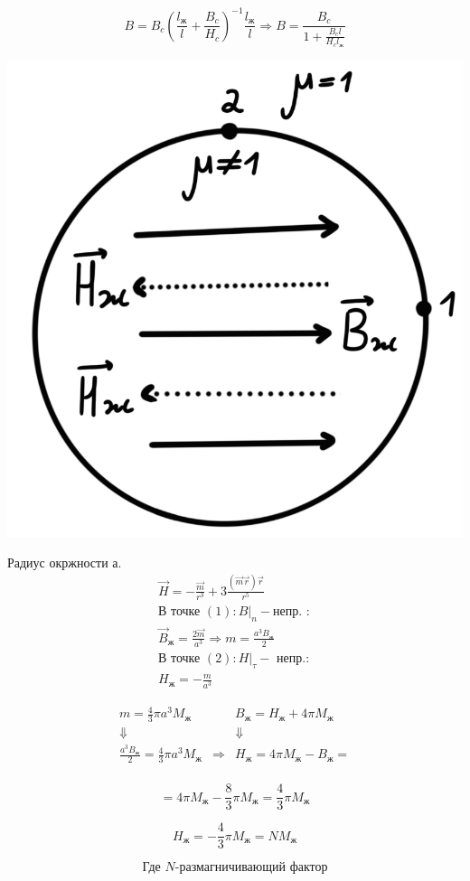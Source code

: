 \[
B=B_c\left( \frac{l_{\text{ж}}}{l}+\frac{B_c}{H_c}  \right)^{-1}\frac{l_{\text{ж}}}{l} \Rightarrow \boxed{B=\frac{B_c}{1+\frac{B_cl}{H_cl_{\text{ж}}} }} 
\]

\begin{minipage}[c]{0.4\textwidth} %
    \includegraphics[width=\textwidth]{im/84.png}%
\end{minipage}%
\hfill
\begin{minipage}[c]{0.6\textwidth} %
    Радиус окржности а.
    \begin{gather*}
        \vec{H}=-\frac{\vec{m}}{r^3}+3\frac{(\vec{m}\vec{r})\vec{r}}{r^5} \\
        \text{В точке }(1): B|_n-\text{непр. }: \\
        \vec{B}_{\text{ж}}=\frac{2\vec{m}}{a^3}\Rightarrow m=\frac{a^3B_{\text{ж}}}{2} \\
        \text{В точке }(2): H|_{\tau}-\text{ непр.}: \\
        H_{\text{ж}}=-\frac{m}{a^3} 
    \end{gather*}
\end{minipage}
\newpage
\[
\begin{array}{ccc}
m=\frac{4}{3}\pi a^3M_{\text{ж}} & & B_{\text{ж}}=H_{\text{ж}}+4\pi M_{\text{ж}} \\
\Downarrow & & \Downarrow \\
\frac{a^3B_{\text{ж}}}{2}=\frac{4}{3}\pi a^3M_{\text{ж}} & \Rightarrow & H_{\text{ж}}=4\pi M_{\text{ж}}-B_{\text{ж}}= \\
\end{array}
\]

\[
=4\pi M_{\text{ж}}-\frac{8}{3}\pi M_{\text{ж}}=\frac{4}{3}\pi M_{\text{ж}}  
\]

\[
H_{\text{ж}}=-\frac{4}{3}\pi M_{\text{ж}}=N M_{\text{ж}}
\]

\[
\text{Где }N\text{-размагничивающий  фактор}
\]